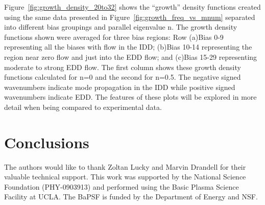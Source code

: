 \documentclass[aip,pop,amsmath,amssymb,reprint,superscriptaddress]{revtex4-1} %
\begin{document}
Figure~\ref{fig:growth_density_20to32} shows the ``growth'' density functions created using the same data presented in Figure~\ref{fig:growth_freq_vs_mnum} separated into different bias groupings and parallel eigenvalue n. The growth density functions shown were averaged for three bias regions: Row (a)Bias 0-9 representing all the biases with flow in the IDD; (b)Bias 10-14 representing the region near zero flow and just into the EDD flow; and (c)Bias 15-29 representing moderate to strong EDD flow. The first column shows these growth density functions calculated for n=0 and the second for n=0.5. The negative signed wavenumbers indicate mode propagation in the IDD while positive signed wavenumbers indicate EDD. The features of these plots will be explored in more detail when being compared to experimental data.

\section{Conclusions}

The authors would like to thank Zoltan Lucky and Marvin Drandell for their valuable technical support.  This work
was supported by the National Science Foundation (PHY-0903913) and performed using the Basic Plasma Science Facility at UCLA. The BaPSF is funded by the
Department of Energy and NSF.
\end{document}
